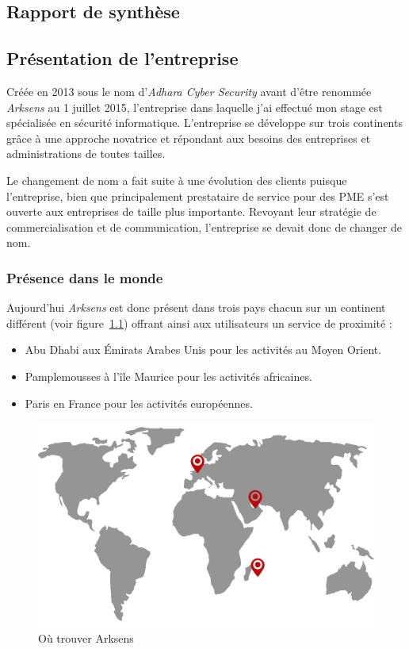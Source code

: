 \documentclass[a4paper,10pt, twoside]{report}
\begin{document}
\begin{spacing}{1.2}
\chapter{Rapport de synth\`ese}
\thispagestyle{fancy}
\label{rapportSynthese}
\section{Pr\'esentation de l'entreprise}
Cr\'e\'ee en 2013 sous le nom d'\textit{Adhara Cyber Security} avant
d'\^etre renomm\'ee \textit{Arksens} au 1 juillet 2015, l'entreprise 
dans laquelle j'ai effectu\'e mon stage est sp\'ecialis\'ee en s\'ecurit\'e
informatique. L'entreprise se d\'eveloppe sur trois continents gr\^ace \`a une
approche novatrice et r\'epondant aux besoins des entreprises et
administrations de toutes tailles.

Le changement de nom a fait suite \`a une \'evolution des clients puisque
l'entreprise, bien que principalement prestataire de service pour des PME
s'est ouverte aux entreprises de taille plus importante. Revoyant leur
strat\'egie de commercialisation et de communication, l'entreprise se devait
donc de changer de nom.

\subsection{Pr\'esence dans le monde}
Aujourd'hui \textit{Arksens} est donc pr\'esent dans trois pays chacun sur
un continent diff\'erent (voir figure~\ref{mapArksens}) offrant ainsi aux
utilisateurs un service de proximit\'e :
\begin{itemize}
  \item Abu Dhabi aux \'Emirats Arabes Unis pour les activit\'es au Moyen
  Orient.
  \item Pamplemousses à l’\^ile Maurice pour les activit\'es africaines.
  \item Paris en France pour les activit\'es européennes.
\end{itemize}

\begin{figure}[h!]
  \centering
  \includegraphics[scale=0.30]{map_arksens.png}
  \caption{\label{mapArksens} O\`u trouver Arksens}
\end{figure}
      

\end{spacing}
\end{document}

